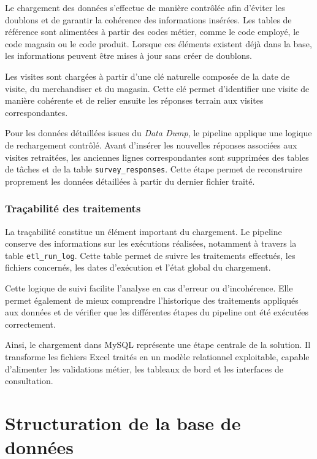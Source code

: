 Le chargement des données s’effectue de manière contrôlée afin d’éviter les doublons et de garantir la cohérence des informations insérées. Les tables de référence sont alimentées à partir des codes métier, comme le code employé, le code magasin ou le code produit. Lorsque ces éléments existent déjà dans la base, les informations peuvent être mises à jour sans créer de doublons.

Les visites sont chargées à partir d’une clé naturelle composée de la date de visite, du merchandiser et du magasin. Cette clé permet d’identifier une visite de manière cohérente et de relier ensuite les réponses terrain aux visites correspondantes.

Pour les données détaillées issues du \textit{Data Dump}, le pipeline applique une logique de rechargement contrôlé. Avant d’insérer les nouvelles réponses associées aux visites retraitées, les anciennes lignes correspondantes sont supprimées des tables de tâches et de la table \texttt{survey\_responses}. Cette étape permet de reconstruire proprement les données détaillées à partir du dernier fichier traité.

\subsubsection{Traçabilité des traitements}

La traçabilité constitue un élément important du chargement. Le pipeline conserve des informations sur les exécutions réalisées, notamment à travers la table \texttt{etl\_run\_log}. Cette table permet de suivre les traitements effectués, les fichiers concernés, les dates d’exécution et l’état global du chargement.

Cette logique de suivi facilite l’analyse en cas d’erreur ou d’incohérence. Elle permet également de mieux comprendre l’historique des traitements appliqués aux données et de vérifier que les différentes étapes du pipeline ont été exécutées correctement.

Ainsi, le chargement dans MySQL représente une étape centrale de la solution. Il transforme les fichiers Excel traités en un modèle relationnel exploitable, capable d’alimenter les validations métier, les tableaux de bord et les interfaces de consultation.

\section{Structuration de la base de données}

